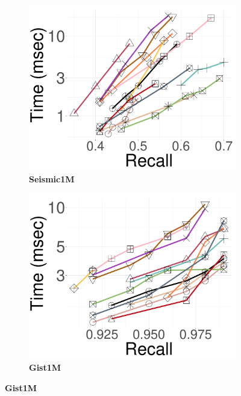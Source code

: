 \begin{figure}[!htb]
	\begin{subfigure}{\soneM\textwidth}
		\centering
		\includegraphics[width=\textwidth]{../img/Experiments/search/1M/seismic_10nn.pdf}
		\caption{\textbf{Seismic1M}} 
		\label{fig:elpis:query:performance:1M:seismic:10NN}
	\end{subfigure}
   \hspace{0.4cm}
	\begin{subfigure}{\soneM\textwidth}
		\centering
		\includegraphics[width=\textwidth]{../img/Experiments/search/1M/gist_10nn.pdf}
		\caption{\textbf{Gist1M}} 
		\label{fig:elpis:query:performance:1M:gist:10NN}

\end{subfigure}
\end{figure}
